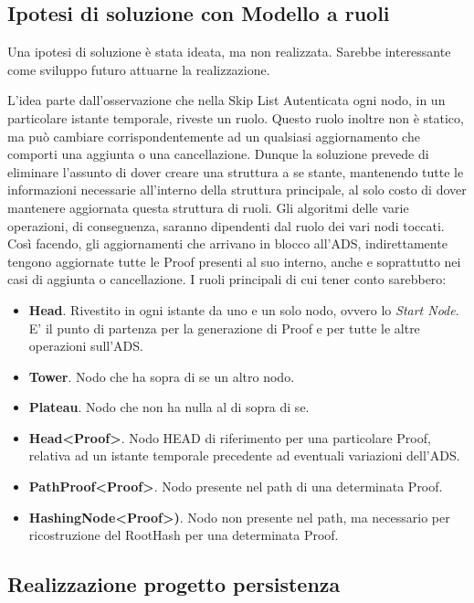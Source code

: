 	\subsection{Ipotesi di soluzione con Modello a ruoli}
	
	
		Una ipotesi di soluzione è stata ideata, ma non realizzata. Sarebbe interessante come sviluppo futuro attuarne la realizzazione.
		
		L'idea parte dall'osservazione che nella Skip List Autenticata ogni nodo, in un particolare istante temporale, riveste un ruolo. Questo ruolo inoltre non è statico, ma può cambiare corrispondentemente ad un qualsiasi aggiornamento che comporti una aggiunta o una cancellazione. Dunque la soluzione prevede di eliminare l'assunto di dover creare una struttura a se stante, mantenendo tutte le informazioni necessarie all'interno della struttura principale, al solo costo di dover mantenere aggiornata questa struttura di ruoli. Gli algoritmi delle varie operazioni, di conseguenza, saranno dipendenti dal ruolo dei vari nodi toccati. Così facendo, gli aggiornamenti che arrivano in blocco all'ADS, indirettamente tengono aggiornate tutte le Proof presenti al suo interno, anche e soprattutto nei casi di aggiunta o cancellazione.
		I ruoli principali di cui tener conto sarebbero:
		\begin{itemize}
			\item \textbf{Head}. Rivestito in ogni istante da uno e un solo nodo, ovvero lo \textit{Start Node}. E' il punto di partenza per la generazione di Proof e per tutte le altre operazioni sull'ADS.
			\item \textbf{Tower}. Nodo che ha sopra di se un altro nodo.
			\item \textbf{Plateau}. Nodo che non ha nulla al di sopra di se.
			\item \textbf{Head<Proof>}. Nodo HEAD di riferimento per una particolare Proof, relativa ad un istante temporale precedente ad eventuali variazioni dell'ADS.
			\item \textbf{PathProof<Proof>}. Nodo presente nel path di una determinata Proof.
			\item \textbf{HashingNode<Proof>)}. Nodo non presente nel path, ma necessario per ricostruzione del RootHash per una determinata Proof.
		\end{itemize}
		
	\subsection{Realizzazione progetto persistenza}
		

